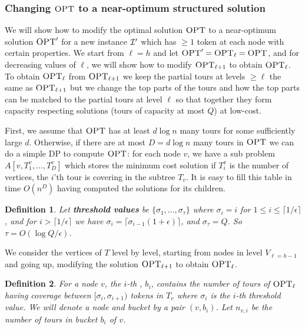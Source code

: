 \documentclass[twoside,leqno]{article}
\newtheorem{definition}{Definition}
\newcommand{\calI}{{\cal I}}
\newcommand{\OPT}{\mbox{\sc OPT}}
\newcommand{\eps}{\epsilon}
\begin{document}
\subsubsection{Changing $\OPT$ to a near-optimum structured solution}
We will show how to modify the optimal solution $\OPT$ to a near-optimum solution $\OPT'$ for a new instance $\calI'$
which has $\geq 1$ token at each node with certain properties.
We start from $\ell=h$ and let $\OPT'=\OPT_\ell=\OPT$, and for decreasing values of $\ell$, we will show how
to modify $\OPT_{\ell+1}$ to
obtain $\OPT_{\ell}$. To obtain $\OPT_{\ell}$ from $\OPT_{\ell+1}$ we keep the partial tours at levels $\geq \ell$ the same as
$\OPT_{\ell+1}$ but we change the top parts of the tours and how the top parts can be matched to the partial tours at
level $\ell$ so that together they form capacity respecting solutions (tours of capacity at most $Q$) at low-cost.

First, we assume that $\OPT$ has at least $d\log n$ many tours for some sufficiently large $d$. Otherwise,
if there are at most $D=d\log n$ many tours in $\OPT$ we can do a simple DP to compute $\OPT$:
for each node $v$, we have a sub problem $A[v,T^v_1,\ldots,T^v_D]$ which stores the minimum cost solution
if $T^v_i$ is the number of vertices, the $i$'th tour is covering in the subtree $T_v$. It is easy to fill this table in
time $O(n^D)$ having computed the solutions for its children.

\begin{definition}
Let \textbf{threshold values} be $\{\sigma_1, \ldots, \sigma_\tau \}$ where $\sigma_i=i$ for $1\leq i\leq \lceil 1/\epsilon\rceil$,
 and for $i>\lceil 1/\epsilon\rceil$ we have $\sigma_i = \lceil\sigma_{i-1}(1 + \eps)\rceil$, and $\sigma_\tau = Q$.
So $\tau=O(\log Q/\epsilon)$.
\end{definition}

We consider the vertices of $T$ level by level, starting from nodes in level $V_{\ell=h-1}$
and going up, modifying the solution $\OPT_{\ell+1}$ to obtain $\OPT_{\ell}$.

\begin{definition}
For a node $v$, the $i$-th , $b_i$, contains the number of tours of $\OPT_\ell$ having coverage between $[\sigma_i, \sigma_{i+1})$ tokens in $T_v$ where $\sigma_i$ is the $i$-th threshold value. We will denote a node and bucket by a pair $(v,b_i)$. Let $n_{v,i}$ be the number of tours in bucket $b_i$ of $v$.
\end{definition}
\end{document}
